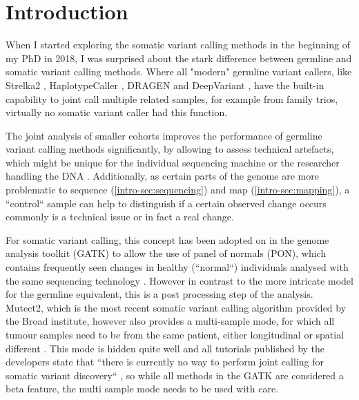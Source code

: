 \section{Introduction}
\label{variantcalling-sec:intro}

When I started exploring the somatic variant calling methods in the beginning of my PhD in 2018, I was surprised about the stark difference between germline and somatic variant calling methods. Where all "modern" germline variant callers, like Strelka2 \cite{Kim2018}, HaplotypeCaller \cite{Poplin2017}, DRAGEN \cite{Miller2015} and DeepVariant \cite{Poplin2018},  have the built-in capability to joint call multiple related samples, for example from family trios, virtually no somatic variant caller had this function. 

The joint analysis of smaller cohorts improves the performance of germline variant calling methods significantly, by allowing to assess technical artefacts, which might be unique for the individual sequencing machine or the researcher handling the DNA \cite{Schirmer2016,Stoler2021}. Additionally, as certain parts of the genome are more problematic to sequence (\autoref{intro-sec:sequencing}) and map (\autoref{intro-sec:mapping}), a ``control`` sample can help to distinguish if a certain observed change occurs commonly is a technical issue or in fact a real change.

For somatic variant calling, this concept has been adopted on in the genome analysis toolkit (GATK) \cite{BrianOConnor2020} to allow the use of panel of normals (PON), which contains frequently seen changes in healthy (``normal``) individuals analysed with the same sequencing technology \cite{GATKTeam2021}. However in contrast to the  more intricate model for the germline equivalent, this is a post processing step of the analysis. Mutect2, which is the most recent somatic variant calling algorithm provided by the Broad institute, however also provides a multi-sample mode, for which all tumour samples need to be from the same patient, either longitudinal or spatial different \cite{GATKTeam2020}. This mode is hidden quite well and all tutorials published by the developers state that ``there is currently no way to perform joint calling for somatic variant discovery`` \cite{GATKTeam2021a}, so while all methods in the GATK are considered a beta feature, the multi sample mode needs to be used with care.

